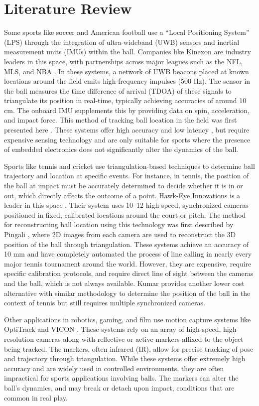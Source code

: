 \documentclass[conference]{IEEEtran}
\begin{document}
\section{Literature Review}

Some sports like soccer and American football use a “Local Positioning System”  (LPS) through the integration of ultra-wideband (UWB) sensors and inertial measurement units (IMUs) within the ball. Companies like Kinexon are industry leaders in this space, with partnerships across major leagues such as the NFL, MLS, and NBA \cite{b1}. In these systems, a network of UWB beacons placed at known locations around the field emits high-frequency impulses (500 Hz). The sensor in the ball measures the time difference of arrival (TDOA) of these signals to triangulate its position in real-time, typically achieving accuracies of around 10 cm. The onboard IMU supplements this by providing data on spin, acceleration, and impact force. This method of tracking ball location in the field was first presented here \cite{b2}. These systems offer high accuracy and low latency \cite{b3}, but require expensive sensing technology and are only suitable for sports where the presence of embedded electronics does not significantly alter the dynamics of the ball.

Sports like tennis and cricket use triangulation-based techniques to determine ball trajectory and location at specific events. For instance, in tennis, the position of the ball at impact must be accurately determined to decide whether it is in or out, which directly affects the outcome of a point. Hawk-Eye Innovations is a leader in this space \cite{b4}. Their system uses 10–12 high-speed, synchronized cameras positioned in fixed, calibrated locations around the court or pitch. The method for reconstructing ball location using this technology was first described by Pingali \cite{b5}, where 2D images from each camera are used to reconstruct the 3D position of the ball through triangulation. These systems achieve an accuracy of 10 mm and have completely automated the process of line calling in nearly every major tennis tournament around the world. However, they are expensive, require specific calibration protocols, and require direct line of sight between the cameras and the ball, which is not always available. Kumar \cite{b6} provides another lower cost alternative with similar methodology to determine the position of the ball in the context of tennis but still requires multiple synchronized cameras. 

Other applications in robotics, gaming, and film use motion capture systems like OptiTrack \cite{b7} and VICON \cite{b8}. These systems rely on an array of high-speed, high-resolution cameras along with reflective or active markers affixed to the object being tracked. The markers, often infrared (IR), allow for precise tracking of pose and trajectory through triangulation. While these systems offer extremely high accuracy and are widely used in controlled environments, they are often impractical for sports applications involving balls. The markers can alter the ball’s dynamics, and may break or detach upon impact, conditions that are common in real play.
\end{document}
